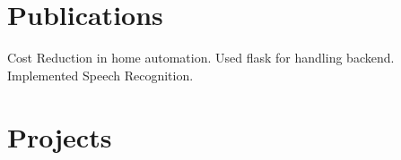 \documentclass[a4paper]{deedy-resume-openfont}
\begin{document}
\begin{minipage}[t]{0.66\textwidth}
\begin{tightemize}
\end{tightemize}



\section{Publications}

Cost Reduction in home automation. Used flask for handling backend. Implemented Speech Recognition.  


\section{Projects}


\end{minipage}
\end{document}
